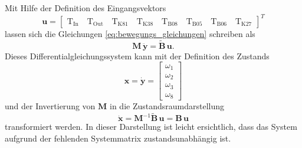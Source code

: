Mit Hilfe der Definition des Eingangsvektors
\begin{equation}\label{eq:u}
\pmb{u} = \begin{bmatrix} \mathrm{T}_{\mathrm{In}} \quad \mathrm{T}_{\mathrm{Out}} \quad \mathrm{T}_{\mathrm{K81}} \quad \mathrm{T}_{\mathrm{K38}} \quad \mathrm{T}_{\mathrm{B08}} \quad \mathrm{T}_{\mathrm{B05}} \quad \mathrm{T}_{\mathrm{B06}} \quad \mathrm{T}_{\mathrm{K27}} \end{bmatrix}^T
\end{equation}
lassen sich die Gleichungen \eqref{eq:bewegungs_gleichungen} schreiben als
\begin{equation}
\pmb{M}\,\ddot{\pmb{y}} = \tilde{\pmb{B}}\,\pmb{u}.
\end{equation}
Dieses Differentialgleichungssystem kann mit der Definition des Zustands
\begin{equation}
\pmb{x} = \dot{\pmb{y}} = \begin{bmatrix} \omega_1 \\ \omega_2 \\ \omega_3 \\ \omega_8\end{bmatrix}
\end{equation}
und der Invertierung von $\pmb{M}$ in die Zustandsraumdarstellung 
\begin{equation}
\dot{\pmb{x}} = \pmb{M}^{-1}\tilde{\pmb{B}}\,\pmb{u} = \pmb{B}\,\pmb{u}
\end{equation}
transformiert werden. In dieser Darstellung ist leicht ersichtlich, dass das System aufgrund der fehlenden Systemmatrix zustandsunabhängig ist.

